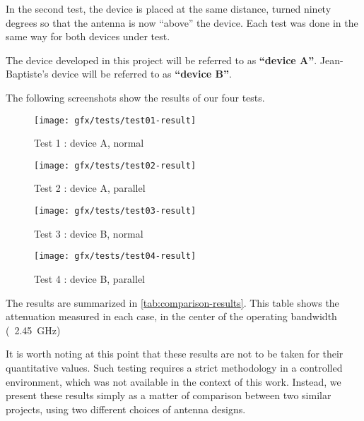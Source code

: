 In the second test, the device is placed at the same distance, turned
ninety degrees so
that the antenna is now ``above'' the device. Each test was done in the same way
for both devices under test.

The device developed in this project will be referred to as \textbf{``device A''}.
Jean-Baptiste's device will be referred to as \textbf{``device B''}.


The following screenshots show the results of our four tests.

\begin{figure}[h!]
  \begin{center}
    \texttt{[image: gfx/tests/test01-result]}
  \end{center}
  \caption{Test 1 : device A, normal}
  \label{fig:test01-result}
\end{figure}

\begin{figure}[h!]
  \begin{center}
    \texttt{[image: gfx/tests/test02-result]}
  \end{center}
  \caption{Test 2 : device A, parallel}
  \label{fig:test02-result}
\end{figure}

\begin{figure}[h!]
  \begin{center}
    \texttt{[image: gfx/tests/test03-result]}
  \end{center}
  \caption{Test 3 : device B, normal}
  \label{fig:test03-result}
\end{figure}

\begin{figure}[h!]
  \begin{center}
    \texttt{[image: gfx/tests/test04-result]}
  \end{center}
  \caption{Test 4 : device B, parallel}
  \label{fig:test04-result}
\end{figure}

\pagebreak

The results are summarized in \autoref{tab:comparison-results}. This table shows
the attenuation measured in each case, in the center of the operating bandwidth
(\ie~\SI{2.45}{GHz})

It is worth noting at this point that these results are not to be taken for
their quantitative values. Such testing requires a strict methodology in
a controlled environment, which was not available in the context of this work.
Instead, we present these results simply as a matter of comparison between two
similar projects, using two different choices of antenna designs.

